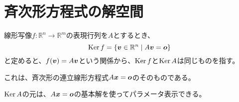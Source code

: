 \documentclass[../../../topic_linear-algebra]{subfiles}
\begin{document}
\sectionline
\section{斉次形方程式の解空間}

線形写像$f\colon \mathbb{R}^n \to \mathbb{R}^m$の表現行列を$A$とするとき、
\begin{equation*}
  \operatorname{Ker} f = \{ \vb*{v} \in \mathbb{R}^n \mid A\vb*{v} = \vb*{o} \}
\end{equation*}
と定めると、$f(\vb*{v}) = A\vb*{v}$という関係から、$\operatorname{Ker} f$と$\operatorname{Ker} A$は同じものを指す。

\br

これは、斉次形の連立線形方程式$A\vb*{x} = \vb*{o}$のそのものである。

$\operatorname{Ker} A$の元は、$A\vb*{x} = \vb*{o}$の基本解を使ってパラメータ表示できる。
\end{document}
